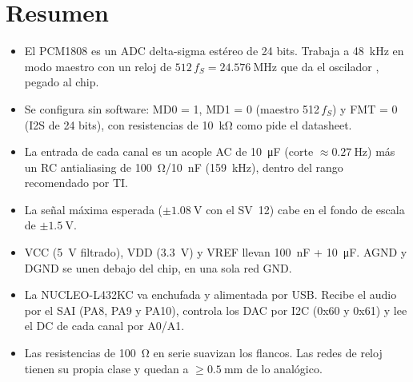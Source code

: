 \section*{Resumen}
\begin{itemize}
  \item El PCM1808 es un ADC delta-sigma estéreo de 24 bits. Trabaja a \SI{48}{\kilo\hertz} en modo maestro con un reloj de $512\,f_S=\SI{24.576}{\mega\hertz}$ que da el oscilador , pegado al chip.
  \item Se configura sin software: MD0 = 1, MD1 = 0 (maestro 512\,$f_S$) y FMT = 0 (I2S de 24 bits), con resistencias de \SI{10}{\kilo\ohm} como pide el datasheet.
  \item La entrada de cada canal es un acople AC de \SI{10}{\micro\farad} (corte $\approx\SI{0.27}{\hertz}$) más un RC antialiasing de \SI{100}{\ohm}/\SI{10}{\nano\farad} (\SI{159}{\kilo\hertz}), dentro del rango recomendado por TI.
  \item La señal máxima esperada ($\pm\SI{1.08}{\volt}$ con el SV~12) cabe en el fondo de escala de $\pm\SI{1.5}{\volt}$.
  \item VCC (\SI{5}{\volt} filtrado), VDD (\SI{3.3}{\volt}) y VREF llevan \SI{100}{\nano\farad} + \SI{10}{\micro\farad}. AGND y DGND se unen debajo del chip, en una sola red GND.
  \item La NUCLEO-L432KC va enchufada y alimentada por USB. Recibe el audio por el SAI (PA8, PA9 y PA10), controla los DAC por I2C (0x60 y 0x61) y lee el DC de cada canal por A0/A1.
  \item Las resistencias de \SI{100}{\ohm} en serie suavizan los flancos. Las redes de reloj tienen su propia clase y quedan a $\ge\SI{0.5}{\milli\meter}$ de lo analógico.
\end{itemize}
